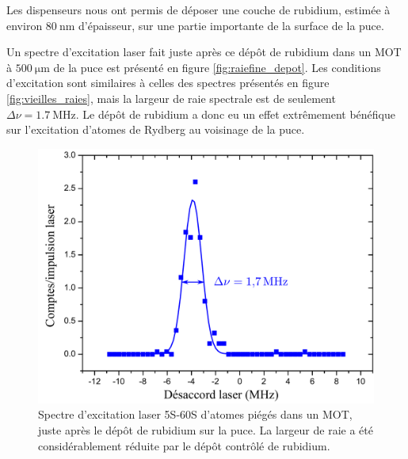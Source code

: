 Les dispenseurs nous ont permis de déposer une couche de rubidium, estimée à environ $\SI{80}{\nano\meter}$ d'épaisseur, sur une partie importante de la surface de la puce.

Un spectre d'excitation laser fait juste après ce dépôt de rubidium dans un MOT à $\SI{500}{\um}$ de la puce est présenté en figure \eqref{fig:raiefine_depot}.
Les conditions d'excitation sont similaires à celles des spectres présentés en figure \eqref{fig:vieilles_raies}, mais la largeur de raie spectrale est de seulement $\Delta\nu=\SI{1.7}{\MHz}$.
Le dépôt de rubidium a donc eu un effet extrêmement bénéfique sur l'excitation d'atomes de Rydberg au voisinage de la puce.
%
\begin{figure}[!th]
\centering
\includegraphics[width=.8\linewidth]{figures/setup/rydberg/raiefine_depot}
\caption[Spectre d'excitation laser 5S-60S juste après le dépôt de rubidium sur la puce]{
Spectre d'excitation laser 5S-60S d'atomes piégés dans un MOT, juste après le dépôt de rubidium sur la puce.
La largeur de raie a été considérablement réduite par le dépôt contrôlé de rubidium.
}
\label{fig:raiefine_depot}
\end{figure}

		

